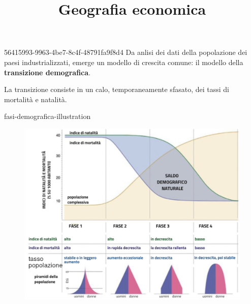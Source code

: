 \documentclass[preview]{standalone}
\begin{document}
\title{Geografia economica}
\genpage

\begin{snippet}{56415993-9963-4be7-8c4f-48791fa9f8d4}
    Da anlisi dei dati della popolazione dei paesi industrializzati,
    emerge un modello di crescita comune:
    il modello della \textbf{transizione demografica}.
    
    La transizione consiste in un calo, temporaneamente sfasato,
    dei tassi di mortalità e natalità.
\end{snippet}

\begin{snippet}{fasi-demografica-illustration}
    \begin{center}
    \begin{figure}[h]
        \centering
        \includegraphics[width=\textwidth]{./resources/fasi_demografia.png}
    \end{figure}
    \end{center}
\end{snippet}
\end{document}
